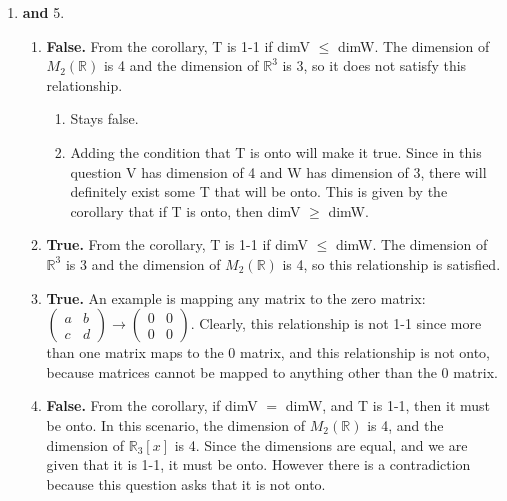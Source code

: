 \documentclass{article}
\begin{document}
\begin{enumerate}
\begin{enumerate}
\end{enumerate}

\item \textbf{and} 5.

\begin{enumerate}

\item \textbf{False.} From the corollary, T is 1-1 if dimV $\leq$ dimW. The dimension of $M_2(\mathbb{R})$ is 4 and the dimension of $\mathbb{R}^3$ is 3, so it does not satisfy this relationship.

\begin{enumerate}

\item Stays false.

\item Adding the condition that T is onto will make it true. Since in this question V has dimension of 4 and W has dimension of 3, there will definitely exist some T that will be onto. This is given by the corollary that if T is onto, then dimV $\geq$ dimW.

\end{enumerate}

\item \textbf{True.} From the corollary, T is 1-1 if dimV $\leq$ dimW. The dimension of $\mathbb{R}^3$ is 3 and the dimension of $M_2(\mathbb{R})$ is 4, so this relationship is satisfied.

\item \textbf{True.} An example is mapping any matrix to the zero matrix: $\left(\begin{array}{cc} a & b \\ c & d \end{array}\right) \rightarrow \left(\begin{array}{cc} 0 & 0 \\ 0 & 0 \end{array}\right)$. Clearly, this relationship is not 1-1 since more than one matrix maps to the 0 matrix, and this relationship is not onto, because matrices cannot be mapped to anything other than the 0 matrix.

\item \textbf{False.} From the corollary, if dimV $=$ dimW, and T is 1-1, then it must be onto. In this scenario, the dimension of $M_2(\mathbb{R})$ is 4, and the dimension of $\mathbb{R}_3[x]$ is 4. Since the dimensions are equal, and we are given that it is 1-1, it must be onto. However there is a contradiction because this question asks that it is not onto.


\end{enumerate}
\end{enumerate}
\end{document}
